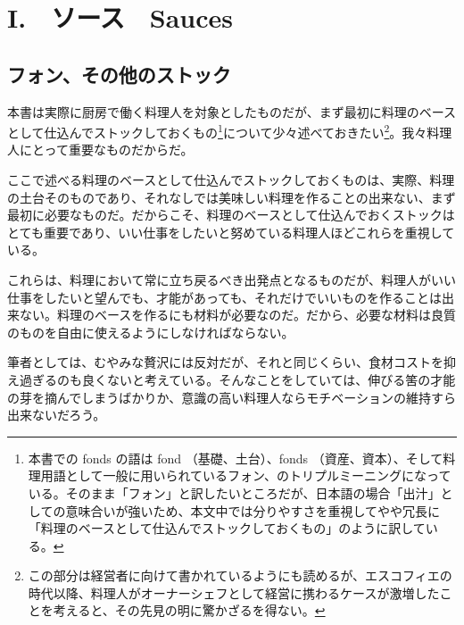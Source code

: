 \href{未、オスマゾームなどについての補足、カレームとの比較}{}
\href{未、原文対照チェック}{} \href{未、日本語表現校正}{}
\href{未、その他修正}{} \href{未、原稿最終校正}{}

\hypertarget{sauces}{%
\chapter{I.　ソース　Sauces}\label{sauces}}

\hypertarget{les-fonds-de-cuisine}{%
\section{フォン、その他のストック}\label{les-fonds-de-cuisine}}


 

\normalsize
{}

本書は実際に厨房で働く料理人を対象としたものだが、まず最初に料理のベースとして仕込んでストックしておくもの\footnote{本書での
  fonds の語は fond （基礎、土台）、fonds
  （資産、資本）、そして料理用語として一般に用いられているフォン、のトリプルミーニングになっている。そのまま「フォン」と訳したいところだが、日本語の場合「出汁」としての意味合いが強いため、本文中では分りやすさを重視してやや冗長に「料理のベースとして仕込んでストックしておくもの」のように訳している。}について少々述べておきたい\footnote{この部分は経営者に向けて書かれているようにも読めるが、エスコフィエの時代以降、料理人がオーナーシェフとして経営に携わるケースが激増したことを考えると、その先見の明に驚かざるを得ない。}。我々料理人にとって重要なものだからだ。

ここで述べる料理のベースとして仕込んでストックしておくものは、実際、料理の土台そのものであり、それなしでは美味しい料理を作ることの出来ない、まず最初に必要なものだ。だからこそ、料理のベースとして仕込んでおくストックはとても重要であり、いい仕事をしたいと努めている料理人ほどこれらを重視している。

これらは、料理において常に立ち戻るべき出発点となるものだが、料理人がいい仕事をしたいと望んでも、才能があっても、それだけでいいものを作ることは出来ない。料理のベースを作るにも材料が必要なのだ。だから、必要な材料は良質のものを自由に使えるようにしなければならない。

筆者としては、むやみな贅沢には反対だが、それと同じくらい、食材コストを抑え過ぎるのも良くないと考えている。そんなことをしていては、伸びる筈の才能の芽を摘んでしまうばかりか、意識の高い料理人ならモチベーションの維持すら出来ないだろう。

